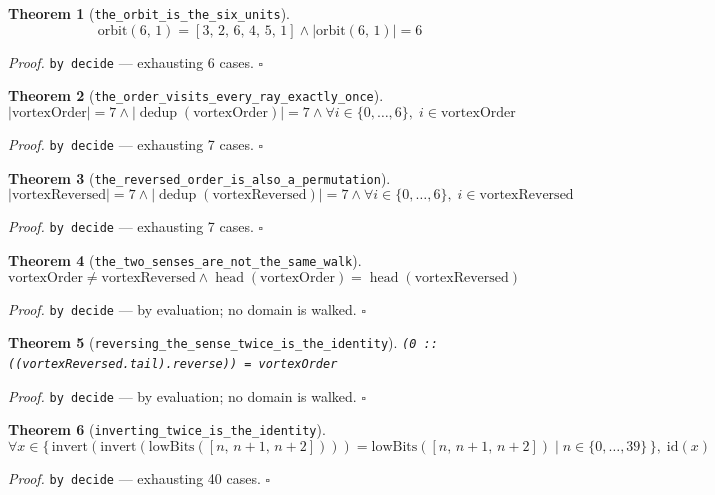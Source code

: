 \documentclass[11pt]{article}
\newtheorem{theorem}{Theorem}[section]
\begin{document}
\begin{theorem}[\texttt{the\_orbit\_is\_the\_six\_units}]
\[ \mathrm{orbit}\mathopen{}\left(6,\,1\right) = [3,\,2,\,6,\,4,\,5,\,1] \land \left|\mathrm{orbit}\mathopen{}\left(6,\,1\right)\right| = 6 \]
\end{theorem}
\noindent\emph{Proof.} \texttt{by decide} --- exhausting 6 cases. \hfill$\square$

\begin{theorem}[\texttt{the\_order\_visits\_every\_ray\_exactly\_once}]
\[ \left|\mathrm{vortexOrder}\right| = 7 \land \left|\operatorname{dedup}\left(\mathrm{vortexOrder}\right)\right| = 7 \land \forall i \in \{0,\dots,6\},\; i \in \mathrm{vortexOrder} \]
\end{theorem}
\noindent\emph{Proof.} \texttt{by decide} --- exhausting 7 cases. \hfill$\square$

\begin{theorem}[\texttt{the\_reversed\_order\_is\_also\_a\_permutation}]
\[ \left|\mathrm{vortexReversed}\right| = 7 \land \left|\operatorname{dedup}\left(\mathrm{vortexReversed}\right)\right| = 7 \land \forall i \in \{0,\dots,6\},\; i \in \mathrm{vortexReversed} \]
\end{theorem}
\noindent\emph{Proof.} \texttt{by decide} --- exhausting 7 cases. \hfill$\square$

\begin{theorem}[\texttt{the\_two\_senses\_are\_not\_the\_same\_walk}]
\[ \mathrm{vortexOrder} \neq \mathrm{vortexReversed} \land \operatorname{head}\left(\mathrm{vortexOrder}\right) = \operatorname{head}\left(\mathrm{vortexReversed}\right) \]
\end{theorem}
\noindent\emph{Proof.} \texttt{by decide} --- by evaluation; no domain is walked. \hfill$\square$

\begin{theorem}[\texttt{reversing\_the\_sense\_twice\_is\_the\_identity}]
\texttt{(0 :: ((vortexReversed.tail).reverse)) = vortexOrder}
\end{theorem}
\noindent\emph{Proof.} \texttt{by decide} --- by evaluation; no domain is walked. \hfill$\square$

\begin{theorem}[\texttt{inverting\_twice\_is\_the\_identity}]
\[ \forall x \in \{\, \mathrm{invert}\mathopen{}\left(\mathrm{invert}\mathopen{}\left(\mathrm{lowBits}\mathopen{}\left([n,\,n + 1,\,n + 2]\right)\right)\right) = \mathrm{lowBits}\mathopen{}\left([n,\,n + 1,\,n + 2]\right) \mid n \in \{0,\dots,39\} \,\},\; \mathrm{id}\mathopen{}\left(x\right) \]
\end{theorem}
\noindent\emph{Proof.} \texttt{by decide} --- exhausting 40 cases. \hfill$\square$
\end{document}
